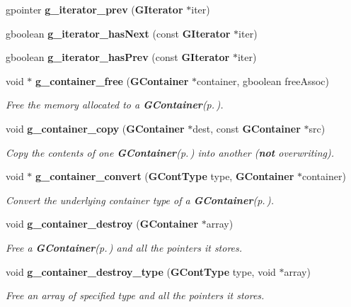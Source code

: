 \begin{CompactItemize}
gpointer {\bf g\_\-iterator\_\-prev} ({\bf GIterator} $\ast$iter)
\item 
gboolean {\bf g\_\-iterator\_\-has\-Next} (const {\bf GIterator} $\ast$iter)
\item 
gboolean {\bf g\_\-iterator\_\-has\-Prev} (const {\bf GIterator} $\ast$iter)
\item 
void $\ast$ {\bf g\_\-container\_\-free} ({\bf GContainer} $\ast$container, gboolean free\-Assoc)
\begin{CompactList}\small\item\em Free the memory allocated to a {\bf GContainer}{\rm (p.\,\pageref{structGContainer})}. \item\end{CompactList}\item 
void {\bf g\_\-container\_\-copy} ({\bf GContainer} $\ast$dest, const {\bf GContainer} $\ast$src)
\begin{CompactList}\small\item\em Copy the contents of one {\bf GContainer}{\rm (p.\,\pageref{structGContainer})} into another ({\bf not} overwriting). \item\end{CompactList}\item 
void $\ast$ {\bf g\_\-container\_\-convert} ({\bf GCont\-Type} type, {\bf GContainer} $\ast$container)
\begin{CompactList}\small\item\em Convert the underlying container type of a {\bf GContainer}{\rm (p.\,\pageref{structGContainer})}. \item\end{CompactList}\item 
void {\bf g\_\-container\_\-destroy} ({\bf GContainer} $\ast$array)
\begin{CompactList}\small\item\em Free a {\bf GContainer}{\rm (p.\,\pageref{structGContainer})} and all the pointers it stores. \item\end{CompactList}\item 
void {\bf g\_\-container\_\-destroy\_\-type} ({\bf GCont\-Type} type, void $\ast$array)
\begin{CompactList}\small\item\em Free an array of specified type and all the pointers it stores. \item\end{CompactList}\end{CompactItemize}


